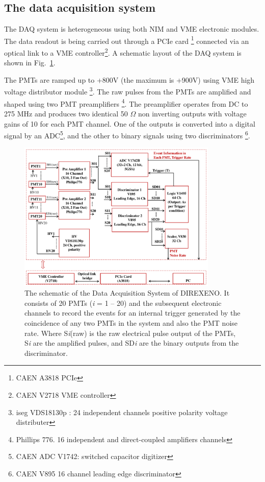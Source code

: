 \subsection{The data acquisition system }
\label{sec:DAQ}


The DAQ system is heterogeneous using both 
NIM and VME electronic modules. The data readout is being carried out through a PCIe card \footnote{CAEN A3818 PCIe}  connected via an optical link to a VME controller\footnote{CAEN V2718 VME controller}. A schematic layout of the DAQ system is shown in Fig.~{\ref{Fig:DAQscheme}}. 


The PMTs are ramped up to +800V (the maximum is +900V) using VME high voltage distributor module \footnote{iseg VDS18130p : 24 independent channels positive polarity voltage distributer}. The raw pulses from the PMTs are amplified and shaped using two PMT preamplifiers \footnote{Phillips 776. 16 independent and direct-coupled amplifiers channels}. The preamplifier operates from DC to 275 MHz and produces two identical 50 $\Omega$ non inverting outputs with voltage gains of 10 for each PMT channel. One of the outputs is converted into a digital signal by an ADC\footnote{CAEN ADC V1742: switched capacitor digitizer}, and the other to binary signals using two discriminators \footnote{CAEN V895 16 channel leading edge discriminator}.

\begin{figure}[h]
   \centering
   \includegraphics[width=0.85\textwidth]{DAQscheme.pdf}
   \caption{The schematic of the Data Acquisition System of DIREXENO. It 
        consists of 20 PMTs ({\it i} = 1 -- 20) and the subsequent electronic channels to record 
        the events for an internal trigger generated by the coincidence of any 
        two PMTs in the system and also the PMT noise rate. Where S{\it i}(raw) is the raw electrical pulse output of the PMTs, S{\it i} are the amplified pulses, and SD{\it i} are the binary outputs from the discriminator. 
}
   \label{Fig:DAQscheme}
\end{figure}

